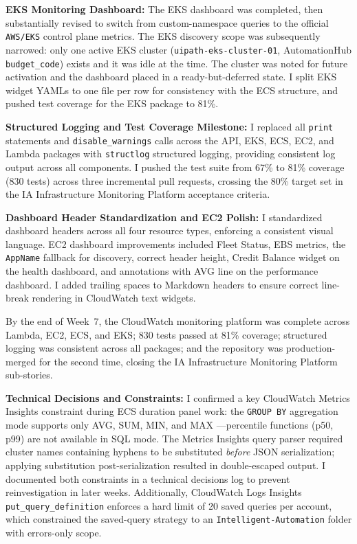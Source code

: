\textbf{EKS Monitoring Dashboard:} 
The EKS dashboard was
completed, then substantially revised to switch
from custom-namespace queries to the official \texttt{AWS/EKS} control
plane metrics. The EKS discovery scope was subsequently narrowed: only
one active EKS cluster (\texttt{uipath-eks-cluster-01}, AutomationHub
\texttt{budget\_code}) exists and it was idle at the time. The cluster was noted
for future activation and the dashboard placed in a ready-but-deferred
state. I split EKS widget YAMLs to one file per row for consistency
with the ECS structure, and pushed test coverage for the EKS package to
81\%.

\textbf{Structured Logging and Test Coverage Milestone:} 
I replaced all \texttt{print} statements and \texttt{disable\_warnings}
calls across the API, EKS, ECS, EC2, and Lambda packages with
\texttt{structlog} structured logging, providing consistent log output
across all components. I pushed the test suite from 67\% to
81\% coverage (830 tests) across three incremental pull requests, crossing the
80\% target set in the IA Infrastructure Monitoring Platform acceptance criteria.

\textbf{Dashboard Header Standardization and EC2 Polish:} 
I standardized dashboard headers across all four resource types,
enforcing a consistent visual language. EC2 dashboard improvements
included Fleet Status, EBS metrics, the \texttt{AppName} fallback
for discovery, correct header height, Credit Balance widget on
the health dashboard, and annotations with AVG line on the
performance dashboard. I added trailing spaces to Markdown headers to ensure correct line-break rendering in CloudWatch text widgets.

By the end of Week~7, the CloudWatch monitoring platform was
complete across Lambda, EC2, ECS, and EKS; 830 tests passed at
81\% coverage; structured logging was consistent across all
packages; and the repository was production-merged for the
second time, closing the IA Infrastructure Monitoring Platform sub-stories.

\textbf{Technical Decisions and Constraints:} 
I confirmed a key CloudWatch Metrics
Insights constraint during ECS duration panel work: the
\texttt{GROUP BY} aggregation mode supports only AVG, SUM, MIN, and MAX
---percentile functions (p50, p99) are not available in SQL mode. The
Metrics Insights query parser required cluster names containing
hyphens to be substituted \emph{before} JSON serialization; applying
substitution post-serialization resulted in double-escaped output. I documented both
constraints in a technical decisions log to prevent
reinvestigation in later weeks. Additionally, CloudWatch Logs Insights
\texttt{put\_query\_definition} enforces a hard limit of 20 saved queries
per account, which constrained the saved-query strategy to an
\texttt{Intelligent-Automation} folder with errors-only scope.


